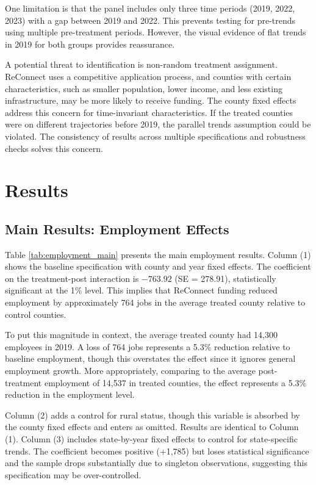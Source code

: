 \documentclass[12pt]{article}
\begin{document}
One limitation is that the panel includes only three time periods (2019, 2022, 2023) with a gap between 2019 and 2022. This prevents testing for pre-trends using multiple pre-treatment periods. However, the visual evidence of flat trends in 2019 for both groups provides reassurance.

A potential threat to identification is non-random treatment assignment. ReConnect uses a competitive application process, and counties with certain characteristics, such as smaller population, lower income, and less existing infrastructure, may be more likely to receive funding. The county fixed effects address this concern for time-invariant characteristics. If the treated counties were on different trajectories before 2019, the parallel trends assumption could be violated. The consistency of results across multiple specifications and robustness checks solves this concern.

\section{Results}

\subsection{Main Results: Employment Effects}

Table \ref{tab:employment_main} presents the main employment results. Column (1) shows the baseline specification with county and year fixed effects. The coefficient on the treatment-post interaction is $-763.92$ (SE = 278.91), statistically significant at the 1\% level. This implies that ReConnect funding reduced employment by approximately 764 jobs in the average treated county relative to control counties.

To put this magnitude in context, the average treated county had 14,300 employees in 2019. A loss of 764 jobs represents a 5.3\% reduction relative to baseline employment, though this overstates the effect since it ignores general employment growth. More appropriately, comparing to the average post-treatment employment of 14,537 in treated counties, the effect represents a 5.3\% reduction in the employment level.

Column (2) adds a control for rural status, though this variable is absorbed by the county fixed effects and enters as omitted. Results are identical to Column (1). Column (3) includes state-by-year fixed effects to control for state-specific trends. The coefficient becomes positive (+1,785) but loses statistical significance and the sample drops substantially due to singleton observations, suggesting this specification may be over-controlled.
\end{document}

